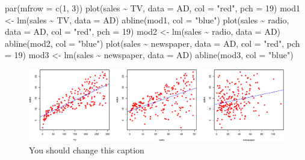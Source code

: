 \documentclass[
]{article}
\newenvironment{Shaded}{\begin{snugshade}}{\end{snugshade}}
\newcommand{\AttributeTok}[1]{\textcolor[rgb]{0.77,0.63,0.00}{#1}}
\newcommand{\DecValTok}[1]{\textcolor[rgb]{0.00,0.00,0.81}{#1}}
\newcommand{\FunctionTok}[1]{\textcolor[rgb]{0.00,0.00,0.00}{#1}}
\newcommand{\NormalTok}[1]{#1}
\newcommand{\OtherTok}[1]{\textcolor[rgb]{0.56,0.35,0.01}{#1}}
\newcommand{\SpecialCharTok}[1]{\textcolor[rgb]{0.00,0.00,0.00}{#1}}
\newcommand{\StringTok}[1]{\textcolor[rgb]{0.31,0.60,0.02}{#1}}
\begin{document}
\begin{Shaded}
\begin{Highlighting}[]
\FunctionTok{par}\NormalTok{(}\AttributeTok{mfrow =} \FunctionTok{c}\NormalTok{(}\DecValTok{1}\NormalTok{, }\DecValTok{3}\NormalTok{))}
\FunctionTok{plot}\NormalTok{(sales }\SpecialCharTok{\textasciitilde{}}\NormalTok{ TV, }\AttributeTok{data =}\NormalTok{ AD, }\AttributeTok{col =} \StringTok{"red"}\NormalTok{, }\AttributeTok{pch =} \DecValTok{19}\NormalTok{)}
\NormalTok{mod1 }\OtherTok{\textless{}{-}} \FunctionTok{lm}\NormalTok{(sales }\SpecialCharTok{\textasciitilde{}}\NormalTok{ TV, }\AttributeTok{data =}\NormalTok{ AD)}
\FunctionTok{abline}\NormalTok{(mod1, }\AttributeTok{col =} \StringTok{"blue"}\NormalTok{)}
\FunctionTok{plot}\NormalTok{(sales }\SpecialCharTok{\textasciitilde{}}\NormalTok{ radio, }\AttributeTok{data =}\NormalTok{ AD, }\AttributeTok{col =} \StringTok{"red"}\NormalTok{, }\AttributeTok{pch =} \DecValTok{19}\NormalTok{)}
\NormalTok{mod2 }\OtherTok{\textless{}{-}} \FunctionTok{lm}\NormalTok{(sales }\SpecialCharTok{\textasciitilde{}}\NormalTok{ radio, }\AttributeTok{data =}\NormalTok{ AD)}
\FunctionTok{abline}\NormalTok{(mod2, }\AttributeTok{col =} \StringTok{"blue"}\NormalTok{)}
\FunctionTok{plot}\NormalTok{(sales }\SpecialCharTok{\textasciitilde{}}\NormalTok{ newspaper, }\AttributeTok{data =}\NormalTok{ AD, }\AttributeTok{col =} \StringTok{"red"}\NormalTok{, }\AttributeTok{pch =} \DecValTok{19}\NormalTok{)}
\NormalTok{mod3 }\OtherTok{\textless{}{-}} \FunctionTok{lm}\NormalTok{(sales }\SpecialCharTok{\textasciitilde{}}\NormalTok{ newspaper, }\AttributeTok{data =}\NormalTok{ AD)}
\FunctionTok{abline}\NormalTok{(mod3, }\AttributeTok{col =} \StringTok{"blue"}\NormalTok{)}
\end{Highlighting}
\end{Shaded}

\begin{figure}

{\centering \includegraphics{SDM-CHAP24_files/figure-latex/youchange-1} 

}

\caption{You should change this caption}\label{fig:youchange}
\end{figure}
\end{document}
